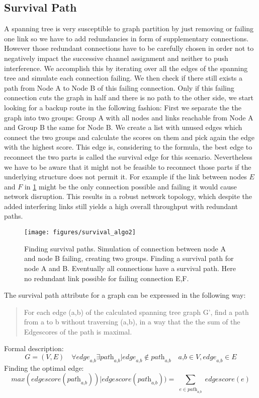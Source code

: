   \subsection{Survival Path}
  A spanning tree is very susceptible to graph partition by just removing or failing one link so we have to add redundancies in form of supplementary connections.
  However those redundant connections have to be carefully chosen in order not to negatively impact the successive channel assignment and neither to push interference.
  We accomplish this by iterating over all the edges of the spanning tree and simulate each connection failing. We then check if there still exists 
  a path from Node A to Node B of this failing connection. Only if this failing connection cuts the graph in half and there is no path to the other side,
  we start looking for a backup route in the following fashion:
  First we separate the the graph into two groups: Group A with all nodes and links reachable from Node A and Group B the same for Node B.
  We create a list with unused edges which connect the two groups and calculate the scores on them and pick again the edge with the highest score.
  This edge is, considering to the formula, the best edge to reconnect the two parts is called the survival edge for this scenario.
  Nevertheless we have to be aware that it might not be feasible to reconnect those parts if the underlying structure does not permit it.
  For example if the link between nodes \(E\) and \(F\) in \ref{fig:survival_algo} might be the only connection possible and failing it would cause network disruption.
  This results in a robust network topology, which despite the added interfering links still yields a high overall throughput with redundant paths.
  \begin{figure}[h]
    \centering
    \texttt{[image: figures/survival\_algo2]}
    \caption{Finding survival paths. Simulation of connection between node A and node B failing, creating two groups.
    Finding a survival path for node A and B. Eventually all connections have a survival path. Here no redundant link possible for failing connection E,F.}
    \label{fig:survival_algo}
  \end{figure}
  The survival path attribute for a graph can be expressed in the following way:
  \begin{quote}
For each edge (a,b) of the calculated spanning tree graph G', find a path from a to b without traversing (a,b), 
in a way that the the sum of the Edgescores of the path is maximal.
  \end{quote}
  Formal description:
  $$\textit{G}=(\textit{V},\textit{E}) \quad
    \forall \textit{edge}_\textit{a,b} \exists \textit{path}_\textit{a,b} | \textit{edge}_\textit{a,b} \notin \textit{path}_\textit{a,b} \quad
    \textit{a,b} \in \textit{V}, \textit{edge}_\textit{a,b} \in \textit{E}$$
    Finding the optimal edge:
    $$\textit{max}(\textit{edgescore}(\textit{path}_\textit{a,b})) |
    \textit{edgescore}(\textit{path}_\textit{a,b})) = \sum_{\substack{e \in \textit{path}_\textit{a,b}}} \textit{edgescore}(e)$$

